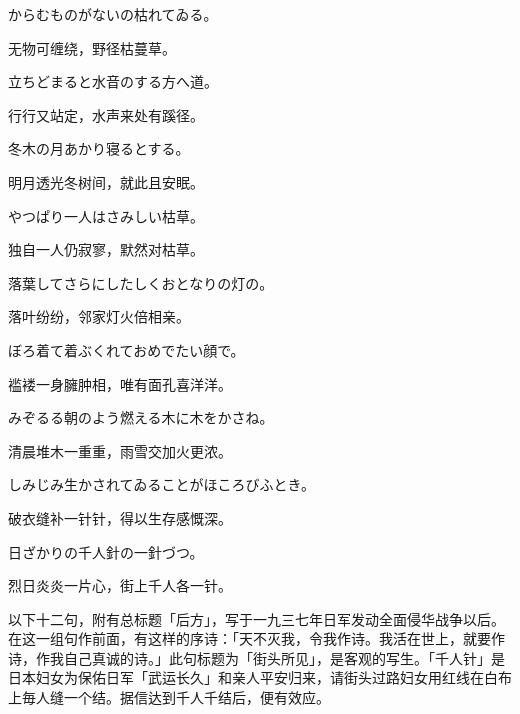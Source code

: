 \begin{haiku}
    {\FH からむものがないの枯れてゐる。}

    {\FK 无物可缠绕，野径枯蔓草。}
\end{haiku}

\begin{haiku}
    {\FH 立ちどまると水音のする方へ道。}

    {\FK 行行又站定，水声来处有蹊径。}
\end{haiku}

\begin{haiku}
    {\FH 冬木の月あかり寝るとする。}

    {\FK 明月透光冬树间，就此且安眠。}
\end{haiku}

\begin{haiku}
    {\FH やつぱり一人はさみしい枯草。}

    {\FK 独自一人仍寂寥，默然对枯草。}
\end{haiku}

\begin{haiku}
    {\FH 落葉してさらにしたしくおとなりの灯の。}

    {\FK 落叶纷纷，邻家灯火倍相亲。}
\end{haiku}

\begin{haiku}
    {\FH ぼろ着て着ぶくれておめでたい顔で。}

    {\FK 褴褛一身臃肿相，唯有面孔喜洋洋。}
\end{haiku}

\begin{haiku}
    {\FH みぞるる朝のよう燃える木に木をかさね。}

    {\FK 清晨堆木一重重，雨雪交加火更浓。}
\end{haiku}

\begin{haiku}
    {\FH しみじみ生かされてゐることがほころびふとき。}

    {\FK 破衣缝补一针针，得以生存感慨深。}
\end{haiku}

\begin{haiku}
    {\FH 日ざかりの千人針の一針づつ。}

    {\FK 烈日炎炎一片心，街上千人各一针。}

    {\FS 以下十二句，附有总标题「后方」，写于一九三七年日军发动全面侵华战争以后。在这一组句作前面，有这样的序诗：「天不灭我，令我作诗。我活在世上，就要作诗，作我自己真诚的诗。」此句标题为「街头所见」，是客观的写生。「千人针」是日本妇女为保佑日军「武运长久」和亲人平安归来，请街头过路妇女用红线在白布上毎人缝一个结。据信达到千人千结后，便有效应。}
\end{haiku}

